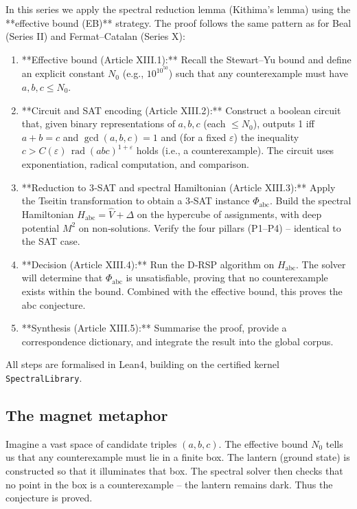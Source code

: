 \documentclass[11pt,a4paper]{article}
\begin{document}
In this series we apply the spectral reduction lemma (Kithima's lemma) using the **effective bound (EB)** strategy. The proof follows the same pattern as for Beal (Series II) and Fermat–Catalan (Series X):
\begin{enumerate}
\item **Effective bound (Article XIII.1):** Recall the Stewart–Yu bound and define an explicit constant $N_0$ (e.g., $10^{10^{50}}$) such that any counterexample must have $a,b,c \le N_0$.
\item **Circuit and SAT encoding (Article XIII.2):** Construct a boolean circuit that, given binary representations of $a,b,c$ (each $\le N_0$), outputs 1 iff $a+b=c$ and $\gcd(a,b,c)=1$ and (for a fixed $\varepsilon$) the inequality $c > C(\varepsilon)\,\operatorname{rad}(abc)^{1+\varepsilon}$ holds (i.e., a counterexample). The circuit uses exponentiation, radical computation, and comparison.
\item **Reduction to 3‑SAT and spectral Hamiltonian (Article XIII.3):** Apply the Tseitin transformation to obtain a 3‑SAT instance $\Phi_{\text{abc}}$. Build the spectral Hamiltonian $H_{\text{abc}} = \hat{V} + \Delta$ on the hypercube of assignments, with deep potential $M^2$ on non‑solutions. Verify the four pillars (P1–P4) – identical to the SAT case.
\item **Decision (Article XIII.4):** Run the D‑RSP algorithm on $H_{\text{abc}}$. The solver will determine that $\Phi_{\text{abc}}$ is unsatisfiable, proving that no counterexample exists within the bound. Combined with the effective bound, this proves the abc conjecture.
\item **Synthesis (Article XIII.5):** Summarise the proof, provide a correspondence dictionary, and integrate the result into the global corpus.
\end{enumerate}
All steps are formalised in Lean4, building on the certified kernel \texttt{SpectralLibrary}.

\subsection{The magnet metaphor}

Imagine a vast space of candidate triples $(a,b,c)$. The effective bound $N_0$ tells us that any counterexample must lie in a finite box. The lantern (ground state) is constructed so that it illuminates that box. The spectral solver then checks that no point in the box is a counterexample – the lantern remains dark. Thus the conjecture is proved.
\end{document}
